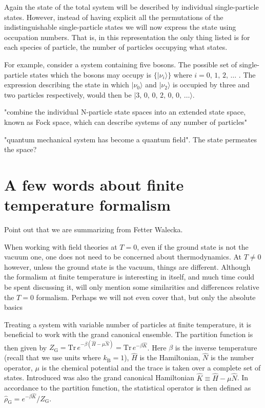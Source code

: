 \documentclass[12pt]{report}
\newcommand{\todo}[1]{{\leavevmode\color{todo}#1}}
\begin{document}
Again the state of the total system will be described by individual single-particle states. However, instead of having explicit all the permutations of the indistinguishable single-particle states we will now express the state using occupation numbers. That is, in this representation the only thing listed is for each species of particle, the number of particles occupying what states.

For example, consider a system containing five bosons. The possible set of single-particle states which the bosons may occupy is $ \{ | \nu_i \rangle \} $ where $ i = 0, \, 1, \, 2, \, \dots $ . The expression describing the state in which $ | \nu_0 \rangle $ and $ | \nu_2 \rangle $ is occupied by three and two particles respectively, would then be $ |3, \, 0, \, 0, \, 2, \, 0, \, 0, \, \dots \rangle $.


\todo{"combine the individual N-particle state spaces into an extended state space, known as Fock space, which can describe systems of any number of particles"}

\todo{"quantum mechanical system has become a quantum field". The state permeates the space?}


\section{A few words about finite temperature formalism}

\todo{Point out that we are summarizing from Fetter Walecka.}

When working with field theories at $ T = 0 $, even if the ground state is not the vacuum one, one does not need to be concerned about thermodynamics. At $ T \neq 0 $ however, unless the ground state is the vacuum, things are different. Although the formalism at finite temperature is interesting in itself, and much time could be spent discussing it, will only mention some similarities and differences relative the $ T = 0 $ formalism. \todo{Perhaps we will not even cover that, but only the absolute basics}

Treating a system with variable number of particles at finite temperature, it is beneficial to work with the grand canonical ensemble. The partition function is then given by $ Z_\text{G} = \text{Tr} \, e^{-\beta (\hat H - \mu \hat N)} = \text{Tr} \, e^{-\beta \hat K} $. Here $ \beta $ is the inverse temperature (recall that we use units where $ k_\text{B} = 1 $), $ \hat H $ is the Hamiltonian, $ \hat N $ is the number operator, $ \mu $ is the chemical potential and the trace is taken over a complete set of states. Introduced was also the grand canonical Hamiltonian $ \hat K \equiv \hat H - \mu \hat N $. In accordance to the partition function, the statistical operator is then defined as $ \hat \rho_\text{G} = e^{-\beta \hat K} / Z_\text{G} $.
\end{document}

